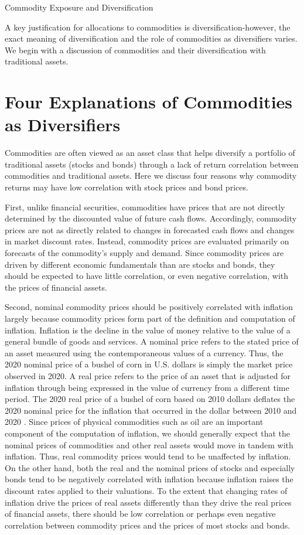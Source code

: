 \documentclass[11pt]{article}
\begin{document}
Commodity Exposure and Diversification

A key justification for allocations to commodities is diversification-however, the exact meaning of diversification and the role of commodities as diversifiers varies. We begin with a discussion of commodities and their diversification with traditional assets.

\section*{Four Explanations of Commodities as Diversifiers}
Commodities are often viewed as an asset class that helps diversify a portfolio of traditional assets (stocks and bonds) through a lack of return correlation between commodities and traditional assets. Here we discuss four reasons why commodity returns may have low correlation with stock prices and bond prices.

First, unlike financial securities, commodities have prices that are not directly determined by the discounted value of future cash flows. Accordingly, commodity prices are not as directly related to changes in forecasted cash flows and changes in market discount rates. Instead, commodity prices are evaluated primarily on forecasts of the commodity's supply and demand. Since commodity prices are driven by different economic fundamentals than are stocks and bonds, they should be expected to have little correlation, or even negative correlation, with the prices of financial assets.

Second, nominal commodity prices should be positively correlated with inflation largely because commodity prices form part of the definition and computation of inflation. Inflation is the decline in the value of money relative to the value of a general bundle of goods and services. A nominal price refers to the stated price of an asset measured using the contemporaneous values of a currency. Thus, the 2020 nominal price of a bushel of corn in U.S. dollars is simply the market price observed in 2020. A real price refers to the price of an asset that is adjusted for inflation through being expressed in the value of currency from a different time period. The 2020 real price of a bushel of corn based on 2010 dollars deflates the 2020 nominal price for the inflation that occurred in the dollar between 2010 and 2020 . Since prices of physical commodities such as oil are an important component of the computation of inflation, we should generally expect that the nominal prices of commodities and other real assets would move in tandem with inflation. Thus, real commodity prices would tend to be unaffected by inflation. On the other hand, both the real and the nominal prices of stocks and especially bonds tend to be negatively correlated with inflation because inflation raises the discount rates applied to their valuations. To the extent that changing rates of inflation drive the prices of real assets differently than they drive the real prices of financial assets, there should be low correlation or perhaps even negative correlation between commodity prices and the prices of most stocks and bonds.
\end{document}
